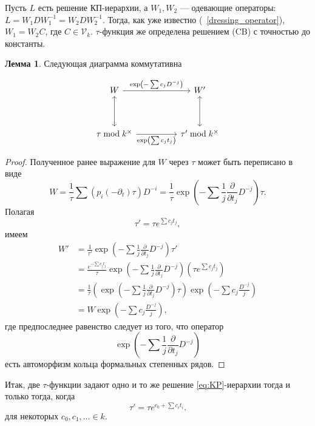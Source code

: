 \documentclass{article}
\theoremstyle{definition}
\theoremstyle{definition} %
\theoremstyle{remark}     %
\theoremstyle{definition}
\theoremstyle{definition}
\theoremstyle{definition}
\theoremstyle{definition}
\newtheorem{lemma}[theorem]{Лемма}
\theoremstyle{definition}
\theoremstyle{definition}
\theoremstyle{definition}
\theoremstyle{definition}
\begin{document}
Пусть \( L \) есть решение КП-иерархии, а \( W_1, W_2 \) — одевающие операторы:  
\( L = W_1 D W_1^{-1} = W_2 D W_2^{-1} \). Тогда, как уже известно (~\ref{dressing_operator}), \( W_1 = W_2 C \), где \( C \in \mathcal{V}_k \). \(\tau\)-функция же определена решением (CB) с точностью до константы.

\begin{lemma}
  Следующая диаграмма коммутативна

    
\begingroup
{}
\[
\begin{tikzcd}
	W \arrow[rr, "\exp\left(-\sum c_j D^{-j}\right)"] \arrow[dd, leftrightarrow] & & W' \arrow[dd, leftrightarrow] \\
	\\
	\tau \bmod k^{\times} \arrow[rr, "\exp\left(\sum c_j t_j\right)"'] & & \tau' \bmod k^{\times}
\end{tikzcd}
\]
\endgroup





\end{lemma}

\begin{proof}
  Полученное ранее выражение для \(W\) через \(\tau\) может быть переписано в виде
  \[
    W = \frac{1}{\tau} \sum (p_i(-\partial_t) \tau) D^{-i} = \frac{1}{\tau} \exp\left(-\sum \frac{1}{j} \frac{\partial}{\partial t_j} D^{-j}\right) \tau.
  \]
  Полагая
  \[
    \tau' = \tau e^{\sum c_j t_j},
  \]
  имеем
  \[
    \begin{aligned}
      W' &= \frac{1}{\tau'} \exp\left(-\sum \frac{1}{j} \frac{\partial}{\partial t_j} D^{-j}\right) \tau' \\
         &= \frac{e^{-\sum c_j t_j}}{\tau} \exp\left(-\sum \frac{1}{j} \frac{\partial}{\partial t_j} D^{-j}\right) (\tau e^{\sum c_j t_j}) \\
         &= \frac{1}{\tau} \left( \exp\left(-\sum \frac{1}{j} \frac{\partial}{\partial t_j} D^{-j}\right) \tau \right) \exp\left(-\sum c_j \frac{D^{-j}}{j}\right) \\
         &= W \exp\left(-\sum c_j \frac{D^{-j}}{j}\right),
    \end{aligned}
  \]
  где предпоследнее равенство следует из того, что оператор
  \[
    \exp\left(-\sum \frac{1}{j} \frac{\partial}{\partial t_j} D^{-j}\right)
  \]
  есть автоморфизм кольца формальных степенных рядов.
\end{proof}

Итак, две \(\tau\)-функции задают одно и то же решение \ref{eq:KP}-иерархии тогда и только тогда, когда
\[
\tau' = \tau e^{c_0 + \sum c_i t_i}.
\]
для некоторых $c_0, c_1, \hdots \in k$.
\end{document}
